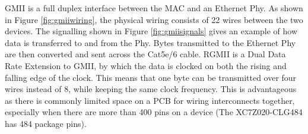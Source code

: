 \par GMII is a full duplex interface between the MAC and an Ethernet Phy. As shown in Figure \ref{fig:gmiiwiring}, the physical wiring 
consists of 22 wires between the two devices. The signalling shown in Figure \ref{fig:gmiisignals} gives an example of how data is 
transferred to and from the Phy. Bytes transmitted to the Ethernet Phy are then converted and sent across the 
Cat5e/6 cable. RGMII is a Dual Data Rate Extension to GMII, by which the data is clocked on both the rising and 
falling edge of the clock. This means that one byte can be transmitted over four wires instead of 8, while keeping 
the same clock frequency. This is advantageous as there is commonly limited space on a PCB for wiring interconnects 
together, especially when there are more than 400 pins on a device (The XC7Z020-CLG484 has 
484 package pins). 

